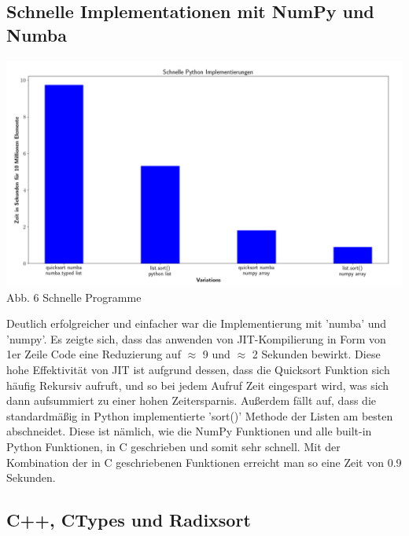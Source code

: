 \documentclass[12pt,a4paper]{article}
\begin{document}
\subsection{Schnelle Implementationen mit NumPy und Numba}

\begin{center}
    \hspace*{-1.5cm}\includegraphics[width=1.2\textwidth]{./diagramme/matplotlib/pythonschnell.png}
    Abb. 6 Schnelle Programme
\end{center}

Deutlich erfolgreicher und einfacher war die Implementierung mit 'numba' und 'numpy'.
Es zeigte sich, dass das anwenden von JIT-Kompilierung in Form von 1er Zeile Code
eine Reduzierung auf $\approx$ 9 und $\approx$ 2 Sekunden bewirkt. Diese hohe Effektivität von JIT
ist aufgrund dessen, dass die Quicksort Funktion sich häufig Rekursiv aufruft, und so bei jedem Aufruf
Zeit eingespart wird, was sich dann aufsummiert zu einer hohen Zeitersparnis.
Außerdem fällt auf, dass die standardmäßig in Python implementierte 'sort()' Methode der Listen
am besten abschneidet. Diese ist nämlich, wie die NumPy Funktionen und alle built-in Python Funktionen, in C geschrieben und
somit sehr schnell. Mit der Kombination der in C geschriebenen Funktionen erreicht man so eine Zeit von 0.9 Sekunden.

\subsection{C++, CTypes und Radixsort}
\end{document}
